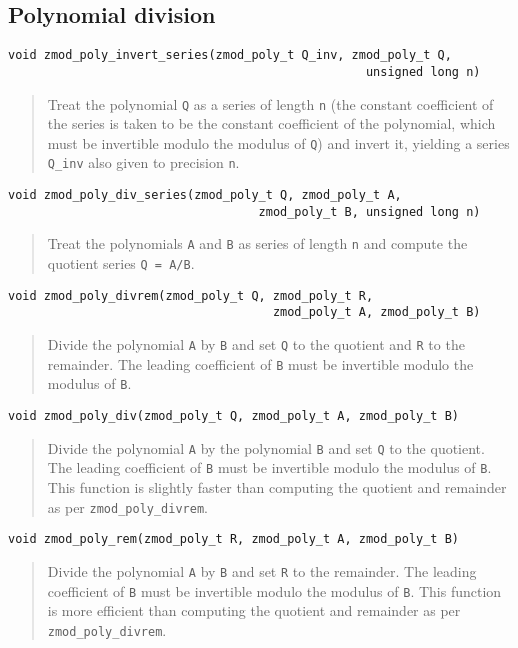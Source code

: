 \documentclass[a4paper,10pt]{article}
\newcommand{\code}{\lstinline}
\begin{document}
\subsection{Polynomial division}
\begin{lstlisting}
void zmod_poly_invert_series(zmod_poly_t Q_inv, zmod_poly_t Q, 
                                                  unsigned long n)
\end{lstlisting}
\begin{quote}
Treat the polynomial \code{Q} as a series of length \code{n} (the constant coefficient of the series is taken to be the constant coefficient of the polynomial, which must be invertible modulo the modulus of \code{Q}) and invert it, yielding a series \code{Q_inv} also given to precision \code{n}. 
\end{quote}

\begin{lstlisting}
void zmod_poly_div_series(zmod_poly_t Q, zmod_poly_t A, 
                                   zmod_poly_t B, unsigned long n)
\end{lstlisting}
\begin{quote}
Treat the polynomials \code{A} and \code{B} as series of length \code{n} and compute the quotient series \code{Q = A/B}.
\end{quote}

\begin{lstlisting}
void zmod_poly_divrem(zmod_poly_t Q, zmod_poly_t R, 
                                     zmod_poly_t A, zmod_poly_t B)
\end{lstlisting}
\begin{quote}
Divide the polynomial \code{A} by \code{B} and set \code{Q} to the quotient and \code{R} to the remainder. The leading coefficient of \code{B} must be invertible modulo the modulus of \code{B}.
\end{quote}

\begin{lstlisting}
void zmod_poly_div(zmod_poly_t Q, zmod_poly_t A, zmod_poly_t B)
\end{lstlisting}
\begin{quote}
Divide the polynomial \code{A} by the polynomial \code{B} and set \code{Q} to the quotient. The leading coefficient of \code{B} must be invertible modulo the modulus of \code{B}. This function is slightly faster than computing the quotient and remainder as per \code{zmod_poly_divrem}.
\end{quote}

\begin{lstlisting}
void zmod_poly_rem(zmod_poly_t R, zmod_poly_t A, zmod_poly_t B)
\end{lstlisting}
\begin{quote}
Divide the polynomial \code{A} by \code{B} and set \code{R} to the remainder. The leading coefficient of \code{B} must be invertible modulo the modulus of \code{B}. This function is more efficient than computing the quotient and remainder as per \code{zmod_poly_divrem}.
\end{quote}
\end{document}
